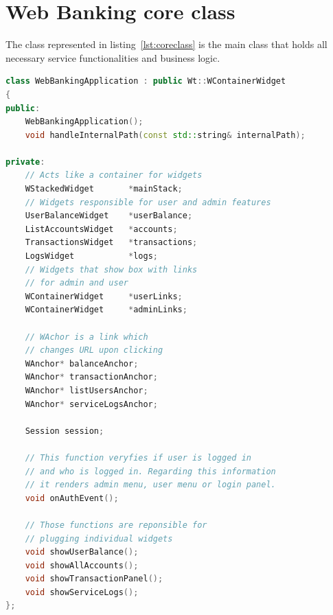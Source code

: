 \documentclass[a4paper,12pt]{book}
\begin{document}
\section{Web Banking core class}
{
The class represented in listing~\ref{lst:coreclass} is the main class that holds all necessary service functionalities and business logic.  
\bigskip
\begin{lstlisting}[frame=single,label={lst:coreclass}, basicstyle=\small, language=C++, caption={WebBankingApplication.h file. Most members are private because they are supposed only to be used in this class, apart from handleInternalPath() which could be used in other widgets that would want to impact the url path. The biggest disadvantage of current implementation is the class became really swell and in future it should be separated into two classes holding user and admin features individually. However the current solution is really simple, which is its biggest advantage. If a programmer would like to add a new page representing new feature, he should first create a new widget were rules of rendering content would be described. Then he should have add an object of this widget in this class and create a function which would clear current widget container and plug the new widget. This function would be called in handle internal path and it would be triggered upon URL change, which as we now would happen by clicking new WAnchor object. }, captionpos=b]
class WebBankingApplication : public Wt::WContainerWidget
{
public:
	WebBankingApplication();
	void handleInternalPath(const std::string& internalPath);
	
private:
	// Acts like a container for widgets
	WStackedWidget       *mainStack;
	// Widgets responsible for user and admin features
	UserBalanceWidget    *userBalance;
	ListAccountsWidget   *accounts;
	TransactionsWidget   *transactions;
	LogsWidget			 *logs;
	// Widgets that show box with links
	// for admin and user
	WContainerWidget     *userLinks;
	WContainerWidget	 *adminLinks;
	
	// WAchor is a link which
	// changes URL upon clicking
	WAnchor* balanceAnchor;
	WAnchor* transactionAnchor;
	WAnchor* listUsersAnchor;
	WAnchor* serviceLogsAnchor;
	
	Session session;
	
	// This function veryfies if user is logged in
	// and who is logged in. Regarding this information
	// it renders admin menu, user menu or login panel.
	void onAuthEvent();	
	
	// Those functions are reponsible for
	// plugging individual widgets
	void showUserBalance();
	void showAllAccounts();
	void showTransactionPanel();
	void showServiceLogs();
};
\end{lstlisting}

}
\end{document}

